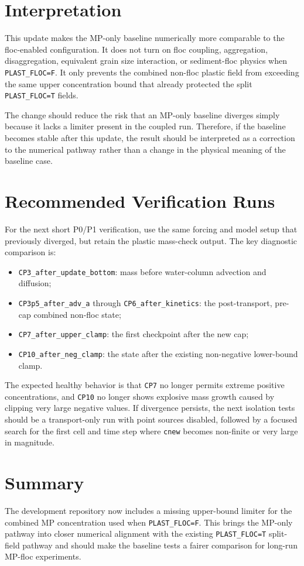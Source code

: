 \documentclass[11pt]{article}
\begin{document}
\section*{Interpretation}

This update makes the MP-only baseline numerically more comparable to the
floc-enabled configuration.  It does not turn on floc coupling, aggregation,
disaggregation, equivalent grain size interaction, or sediment-floc physics
when \texttt{PLAST\_FLOC=F}.  It only prevents the combined non-floc plastic
field from exceeding the same upper concentration bound that already protected
the split \texttt{PLAST\_FLOC=T} fields.

The change should reduce the risk that an MP-only baseline diverges simply
because it lacks a limiter present in the coupled run.  Therefore, if the
baseline becomes stable after this update, the result should be interpreted as
a correction to the numerical pathway rather than a change in the physical
meaning of the baseline case.

\section*{Recommended Verification Runs}

For the next short P0/P1 verification, use the same forcing and model setup
that previously diverged, but retain the plastic mass-check output.  The key
diagnostic comparison is:
\begin{itemize}
  \item \texttt{CP3\_after\_update\_bottom}: mass before water-column
  advection and diffusion;
  \item \texttt{CP3p5\_after\_adv\_a} through \texttt{CP6\_after\_kinetics}:
  the post-transport, pre-cap combined non-floc state;
  \item \texttt{CP7\_after\_upper\_clamp}: the first checkpoint after the
  new cap;
  \item \texttt{CP10\_after\_neg\_clamp}: the state after the existing
  non-negative lower-bound clamp.
\end{itemize}

The expected healthy behavior is that \texttt{CP7} no longer permits extreme
positive concentrations, and \texttt{CP10} no longer shows explosive mass
growth caused by clipping very large negative values.  If divergence persists,
the next isolation tests should be a transport-only run with point sources
disabled, followed by a focused search for the first cell and time step where
\texttt{cnew} becomes non-finite or very large in magnitude.

\section*{Summary}

The development repository now includes a missing upper-bound limiter for the
combined MP concentration used when \texttt{PLAST\_FLOC=F}.  This brings the
MP-only pathway into closer numerical alignment with the existing
\texttt{PLAST\_FLOC=T} split-field pathway and should make the baseline tests a
fairer comparison for long-run MP-floc experiments.
\end{document}
